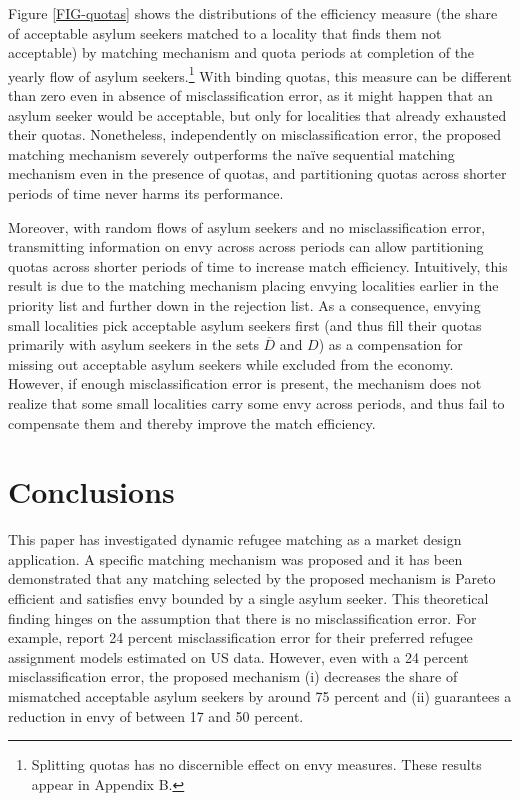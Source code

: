\documentclass[12pt,fleqn]{article}
\begin{document}
Figure \ref{FIG-quotas} shows the distributions of the efficiency measure (the share of acceptable asylum seekers matched to a locality that finds them not acceptable) by matching mechanism and quota periods at completion of the yearly flow of asylum seekers.\footnote{Splitting quotas has no discernible effect on envy measures. These results appear in Appendix B.} With binding quotas, this measure can be different than zero even in absence of misclassification error, as it might happen that an asylum seeker would be acceptable, but only for localities that already exhausted their quotas. Nonetheless, independently on misclassification error, the proposed matching mechanism severely outperforms the na\"{i}ve sequential matching mechanism even in the presence of quotas, and partitioning quotas across shorter periods of time never harms its performance.

Moreover, with random flows of asylum seekers and no misclassification error, transmitting information on envy across across periods can allow partitioning quotas across shorter periods of time to increase match efficiency. Intuitively, this result is due to the matching mechanism placing envying localities earlier in the priority list and further down in the rejection list. As a consequence, envying small localities pick acceptable asylum seekers first (and thus fill their quotas primarily with asylum seekers in the sets $\overline{D}$ and $D$) as a compensation for missing out acceptable asylum seekers while excluded from the economy. However, if enough misclassification error is present, the mechanism does not realize that some small localities carry some envy across periods, and thus fail to compensate them and thereby improve the match efficiency.

\section{Conclusions}\label{SEC:conclusions}
This paper has investigated dynamic refugee matching as a market design application. A specific matching mechanism was proposed and it has been demonstrated that any matching selected by the proposed mechanism is Pareto efficient and satisfies envy bounded by a single asylum seeker. This theoretical finding hinges on the assumption that there is no misclassification error. For example, \cite{bib:BansakEtAl} report 24 percent misclassification error for their preferred refugee assignment models estimated on US data. However, even with a 24 percent misclassification error, the proposed mechanism (i) decreases the share of mismatched acceptable asylum seekers by around 75 percent and (ii) guarantees a reduction in envy of between 17 and 50 percent.
\end{document}
